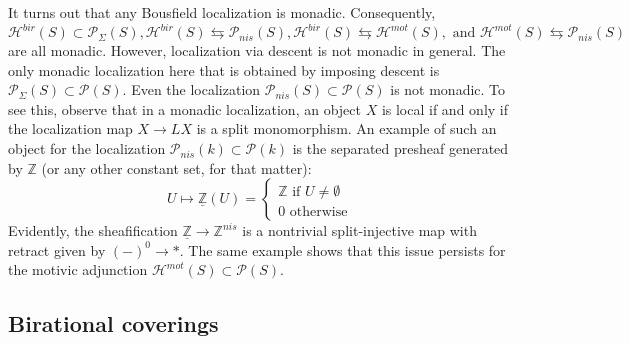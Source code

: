 \begin{rem}
  It turns out that any Bousfield localization is monadic. Consequently, $$\mathcal{H}^{bir}(S)\subset\mathcal{P}_{\Sigma}(S),\mathcal{H}^{bir}(S)\leftrightarrows\mathcal{P}_{nis}(S), \mathcal{H}^{bir}(S)\leftrightarrows\mathcal{H}^{mot}(S),\text{ and }\mathcal{H}^{mot}(S)\leftrightarrows\mathcal{P}_{nis}(S) $$ are all monadic. However, localization via descent is not monadic in general. The only monadic localization here that is obtained by imposing descent is $\mathcal{P}_{\Sigma}(S)\subset \mathcal{P}(S)$. Even the localization $\mathcal{P}_{nis}(S)\subset \mathcal{P}(S)$ is not monadic. To see this, observe that in a monadic localization, an object $X$ is local if and only if the localization map $X\to LX$ is a split monomorphism. An example of such an object for the localization $\mathcal{P}_{nis}(k)\subset \mathcal{P}(k)$ is the separated presheaf generated by $\mathbb{Z}$ (or any other constant set, for that matter):
    $$U\mapsto \underline{\mathbb{Z}}(U)=\begin{cases}\mathbb{Z} \text{  if  } U\neq \emptyset \\
    0 \text{ otherwise}        
    \end{cases}$$
    Evidently, the sheafification $\underline{\mathbb{Z}}\to \mathbb{Z}^{nis}$ is a nontrivial split-injective map with retract given by $(-)^{0}\to *$. The same example shows that this issue persists for the motivic adjunction $\mathcal{H}^{mot}(S)\subset \mathcal{P}(S)$.  
\end{rem}


\subsection{Birational coverings}

